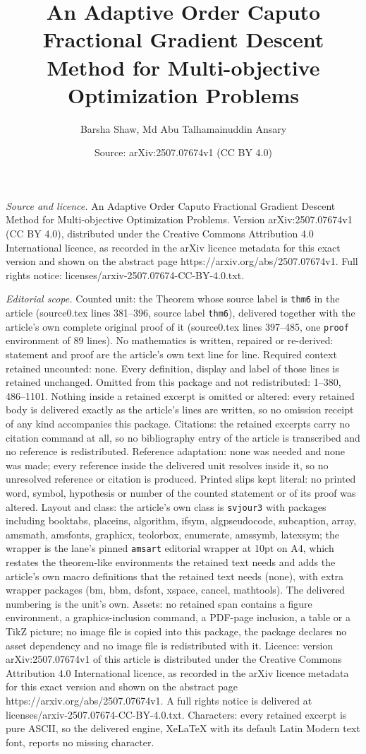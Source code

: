 \documentclass[10pt,a4paper]{amsart}
\title[An Adaptive Order Caputo Fractional Gradient Descent Method ]{An Adaptive Order Caputo Fractional Gradient Descent Method for Multi-objective Optimization Problems}
\author{Barsha Shaw, Md Abu Talhamainuddin Ansary}
\date{Source: arXiv:2507.07674v1 (CC BY 4.0)}
\begin{document}
\maketitle

\noindent\emph{Source and licence.} An Adaptive Order Caputo Fractional Gradient Descent Method for Multi-objective Optimization Problems. Version arXiv:2507.07674v1 (CC BY 4.0), distributed under the Creative Commons Attribution 4.0 International licence, as recorded in the arXiv licence metadata for this exact version and shown on the abstract page https://arxiv.org/abs/2507.07674v1. Full rights notice: licenses/arxiv-2507.07674-CC-BY-4.0.txt.\par\smallskip

\noindent\textit{Editorial scope.} Counted unit: the Theorem whose source label is \texttt{thm6} in the article (source0.tex lines 381--396, source label \texttt{thm6}), delivered together with the article's own complete original proof of it (source0.tex lines 397--485, one \texttt{proof} environment of 89 lines). No mathematics is written, repaired or re-derived: statement and proof are the article's own text line for line. Required context retained uncounted: none. Every definition, display and label of those lines is retained unchanged. Omitted from this package and not redistributed: 1--380, 486--1101. Nothing inside a retained excerpt is omitted or altered: every retained body is delivered exactly as the article's lines are written, so no omission receipt of any kind accompanies this package. Citations: the retained excerpts carry no citation command at all, so no bibliography entry of the article is transcribed and no reference is redistributed. Reference adaptation: none was needed and none was made; every reference inside the delivered unit resolves inside it, so no unresolved reference or citation is produced. Printed slips kept literal: no printed word, symbol, hypothesis or number of the counted statement or of its proof was altered. Layout and class: the article's own class is \texttt{svjour3} with packages including booktabs, placeins, algorithm, ifsym, algpseudocode, subcaption, array, amsmath, amsfonts, graphicx, tcolorbox, enumerate, amssymb, latexsym; the wrapper is the lane's pinned \texttt{amsart} editorial wrapper at 10pt on A4, which restates the theorem-like environments the retained text needs and adds the article's own macro definitions that the retained text needs (none), with extra wrapper packages (bm, bbm, dsfont, xspace, cancel, mathtools). The delivered numbering is the unit's own. Assets: no retained span contains a figure environment, a graphics-inclusion command, a PDF-page inclusion, a table or a TikZ picture; no image file is copied into this package, the package declares no asset dependency and no image file is redistributed with it. Licence: version arXiv:2507.07674v1 of this article is distributed under the Creative Commons Attribution 4.0 International licence, as recorded in the arXiv licence metadata for this exact version and shown on the abstract page https://arxiv.org/abs/2507.07674v1. A full rights notice is delivered at licenses/arxiv-2507.07674-CC-BY-4.0.txt. Characters: every retained excerpt is pure ASCII, so the delivered engine, XeLaTeX with its default Latin Modern text font, reports no missing character.
\end{document}
